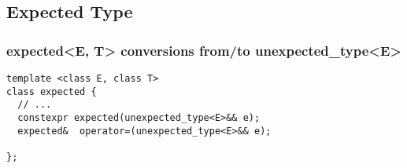\documentclass[xcolor=dvipsnames]{beamer}
\begin{document}
\subsection{Expected Type}

\begin{frame}[fragile]
\frametitle{expected<E, T> conversions from/to unexpected\_type<E>}


\begin{lstlisting}
template <class E, class T>
class expected {
  // ...
  constexpr expected(unexpected_type<E>&& e);
  expected&  operator=(unexpected_type<E>&& e);
  
};
\end{lstlisting}

\end{frame}
\end{document}

